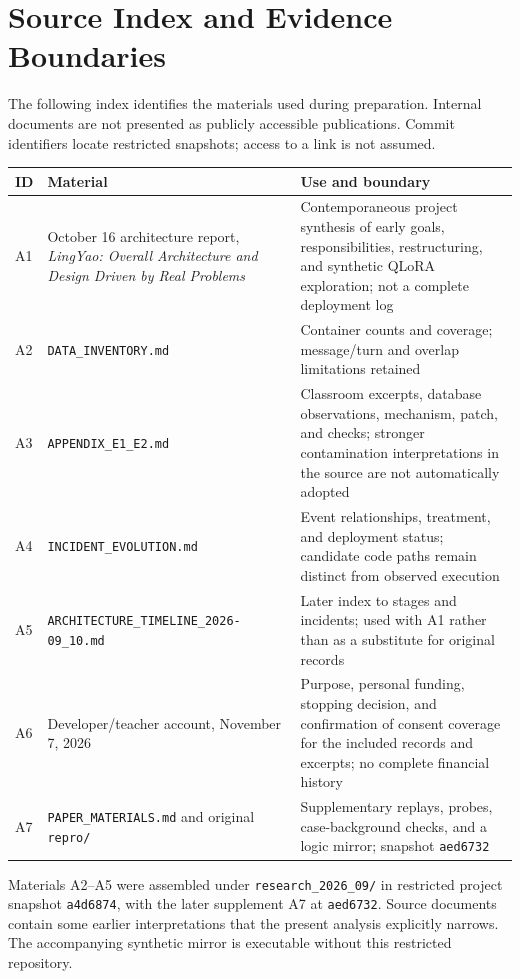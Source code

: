 \documentclass[11pt,a4paper]{article}
\begin{document}
\appendix
\section{Source Index and Evidence Boundaries}\label{app:sources}
The following index identifies the materials used during preparation. Internal documents are not presented as publicly accessible publications. Commit identifiers locate restricted snapshots; access to a link is not assumed.

\small
\begin{longtable}{P{.07\linewidth}P{.39\linewidth}P{.44\linewidth}}
\toprule
ID & Material & Use and boundary \\
\midrule\endhead
A1 & October 16 architecture report, \emph{LingYao: Overall Architecture and Design Driven by Real Problems} & Contemporaneous project synthesis of early goals, responsibilities, restructuring, and synthetic QLoRA exploration; not a complete deployment log \\
A2 & \texttt{DATA\_INVENTORY.md} & Container counts and coverage; message/turn and overlap limitations retained \\
A3 & \texttt{APPENDIX\_E1\_E2.md} & Classroom excerpts, database observations, mechanism, patch, and checks; stronger contamination interpretations in the source are not automatically adopted \\
A4 & \texttt{INCIDENT\_EVOLUTION.md} & Event relationships, treatment, and deployment status; candidate code paths remain distinct from observed execution \\
A5 & \nolinkurl{ARCHITECTURE_TIMELINE_2026-09_10.md} & Later index to stages and incidents; used with A1 rather than as a substitute for original records \\
A6 & Developer/teacher account, November 7, 2026 & Purpose, personal funding, stopping decision, and confirmation of consent coverage for the included records and excerpts; no complete financial history \\
A7 & \texttt{PAPER\_MATERIALS.md} and original \texttt{repro/} & Supplementary replays, probes, case-background checks, and a logic mirror; snapshot \texttt{aed6732} \\
\bottomrule
\end{longtable}
\normalsize
Materials A2--A5 were assembled under \texttt{research\_2026\_09/} in restricted project snapshot \texttt{a4d6874}, with the later supplement A7 at \texttt{aed6732}. Source documents contain some earlier interpretations that the present analysis explicitly narrows. The accompanying synthetic mirror is executable without this restricted repository.
\end{document}

